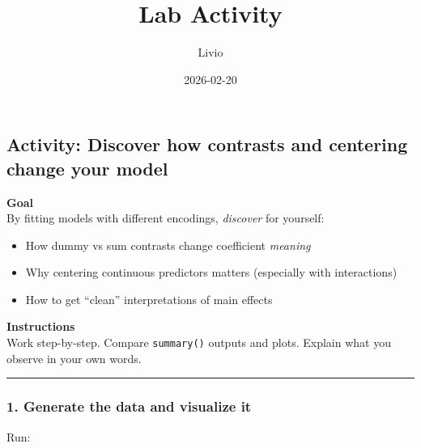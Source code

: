 \documentclass[
]{article}
\title{Lab Activity}
\author{Livio}
\date{2026-02-20}
\providecommand{\tightlist}{%
  \setlength{\itemsep}{0pt}\setlength{\parskip}{0pt}}
\begin{document}
\maketitle

\subsection{Activity: Discover how contrasts and centering change your
model}\label{activity-discover-how-contrasts-and-centering-change-your-model}

\textbf{Goal}\\
By fitting models with different encodings, \emph{discover} for
yourself:

\begin{itemize}
\tightlist
\item
  How dummy vs sum contrasts change coefficient \emph{meaning}\\
\item
  Why centering continuous predictors matters (especially with
  interactions)\\
\item
  How to get ``clean'' interpretations of main effects
\end{itemize}

\textbf{Instructions}\\
Work step-by-step. Compare \texttt{summary()} outputs and plots. Explain
what you observe in your own words.

\begin{center}\rule{0.5\linewidth}{0.5pt}\end{center}

\subsubsection{1. Generate the data and visualize
it}\label{generate-the-data-and-visualize-it}

Run:
\end{document}
